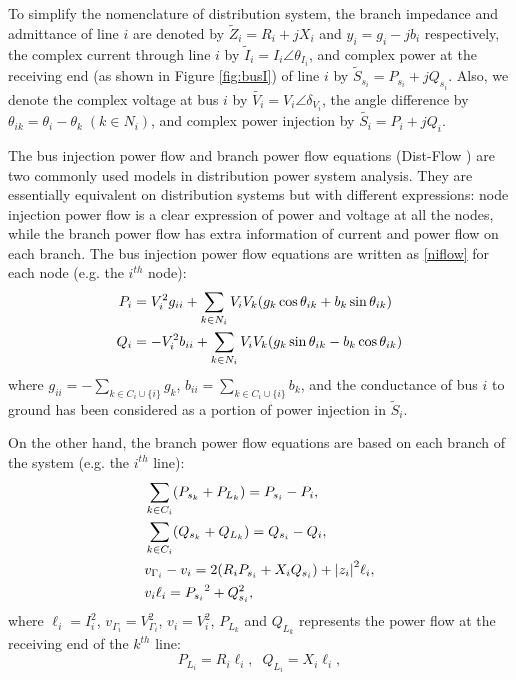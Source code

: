 \documentclass{article}
\begin{document}
To simplify the nomenclature of distribution system, the branch impedance and admittance of line $i$ are denoted by $\tilde Z_i = R_i+jX_i$ and $y_i =g_i-jb_i$ respectively, the complex current through line $i$ by $\tilde{I}_i=I_i\angle \theta_{I_i}$, and complex power at the receiving end (as shown in Figure \ref{fig:busI}) of line $i$ by $\tilde{S}_{s_i}=P_{s_i}+j Q_{s_i}$. Also, we denote the complex voltage at bus $i$ by $\tilde{ V_i }=V_i\angle \delta_{V_i}$, the angle difference by $\theta_{ik} = \theta_{i}-\theta_k\;(k\in N_i)$, and complex power injection by $\tilde{S_i} = P_i +j Q_i$. 

The bus injection power flow and branch power flow equations (Dist-Flow \cite{gan2016online}) are two commonly used models in distribution power system analysis. They are essentially equivalent on distribution systems but with different expressions: node injection power flow is a clear expression of power and voltage at all the nodes, while the branch power flow has extra information of current and power flow on each branch. The bus injection power flow equations are written as \eqref{niflow} for each node (e.g. the $i^{th}$ node):
\begin{subequations}
\label{EPower}
\begin{align}
P_{i} &= V_i^2 g_{ii} +\sum_{k \in N_i } V_{i}V_{k}(g_{k} \cos{ \theta_{ik}}+b_{k}\sin{ \theta_{ik}})\label{biflowa}\\
Q_{i} &=-V_i^2 b_{ii} +\sum_{k \in N_i} V_{i}V_{k}(g_{k}\sin{ \theta_{ik}}-b_{k} \cos{ \theta_{ik}})\label{biflowb}
\end{align}
\label{niflow}\noindent
\end{subequations}\noindent
where $g_{ii}=-\sum_{k \in C_i\cup\{i\}}g_k$, $b_{ii}=\sum_{k \in C_i\cup\{i\}}b_k$, and the conductance of bus $i$ to ground has been considered as a portion of power injection in $\tilde{S}_i$.

On the other hand, the branch power flow equations are based on each branch of the system (e.g. the $i^{th}$ line):
\begin{subequations}
\begin{align}
&\sum_{k \in C_i} (P_{s_k}+P_{L_k})= P_{s_i}  - P_i,  \label{eq:brcha}\\
&\sum_{k \in C_i} (Q_{s_k}+Q_{L_k})= Q_{s_i}   - Q_i \label{eq:brchb}, \\
&v_{\Gamma_i} - v_i = 2(R_i P_{s_i} +X_i Q_{s_i})+{|z_i|}^2\ell_i, \label{eq:brchc}\\
&{v_{i}} \ell_i = {P_{s_i}}^2 + Q_{s_i}^2,
\end{align}
\label{eq:brchflow}\noindent
\end{subequations}\noindent
where $\ell_i = I_i^2$, $v_{\Gamma_i}=V_{\Gamma_i}^2$, $v_i=V^2_{i}$, $P_{L_k}$ and $Q_{L_k}$ represents the power flow at the receiving end of the $k^{th}$ line: 
\begin{equation}
	P_{L_i}= R_i \ell_i,\;\;Q_{L_i}= X_i \ell_i,
	\label{eq:lsdf1}
\end{equation}
\end{document}
